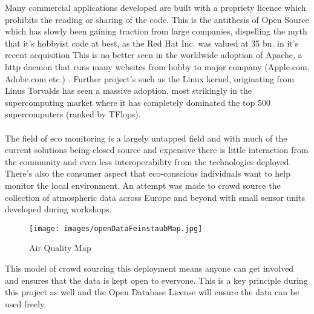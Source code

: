 Many commercial applications developed are built with a propriety licence which prohibits the reading or sharing of the code. This is the antithesis of Open Source which has slowly been gaining traction from large companies, dispelling the myth that it's hobbyist code at best, as the Red Hat Inc. was valued at 35 bn. in it's recent acquisition \citep{Hammond2018} This is no better seen in the worldwide adoption of Apache, a http daemon that runs many websites from hobby to major company (Apple.com, Adobe.com etc.) \citep{W3techs2018}. Further project's such as the Linux kernel, originating from Linus Torvalds has seen a massive adoption, most strikingly in the supercomputing market where it has completely dominated the top 500 supercomputers (ranked by TFlops). \citep{Top5002018}
\\\\
The field of eco monitoring is a largely untapped field and with much of the current solutions being closed source and expensive \citep{TheIoTMarketplace2015} there is little interaction from the community and even less interoperability from the technologies deployed. There's also the consumer aspect that eco-conscious individuals want to help monitor the local environment. An attempt was made to crowd source the collection of atmospheric data \citep{OKLabStuttgart2015} across Europe and beyond with small sensor units developed during workshops.
\begin{figure}[H]
	\centering
	\texttt{[image: images/openDataFeinstaubMap.jpg]}
	\caption{ Air Quality Map \citep{OKLabStuttgart2018}}
	\label{fig:map}
\end{figure}
This model of crowd sourcing this deployment means anyone can get involved and ensures that the data is kept open to everyone. This is a key principle during this project as well and the Open Database License \citep{OpenDataCommons2011} will ensure the data can be used freely.